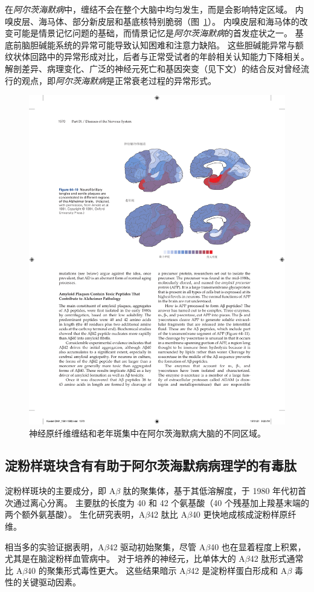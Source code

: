 在\textit{阿尔茨海默病}中，缠结不会在整个大脑中均匀发生，而是会影响特定区域。
内嗅皮层、海马体、部分新皮层和基底核特别脆弱（图~\ref{fig:64_10}）。
内嗅皮层和海马体的改变可能是情景记忆问题的基础，而情景记忆是\textit{阿尔茨海默病}的首发症状之一。
基底前脑胆碱能系统的异常可能导致认知困难和注意力缺陷。
这些胆碱能异常与额纹状体回路中的异常形成对比，后者与正常受试者的年龄相关认知能力下降相关。
解剖差异、病理变化、广泛的神经元死亡和基因突变（见下文）的结合反对曾经流行的观点，即\textit{阿尔茨海默病}是正常衰老过程的异常形式。


\begin{figure}[htbp]
	\centering
	\includegraphics[width=0.7\linewidth]{chap64/fig_64_10}
	\caption{神经原纤维缠结和老年斑集中在阿尔茨海默病大脑的不同区域\cite{arnold1991topographical}。}
	\label{fig:64_10}
\end{figure}



\subsection{淀粉样斑块含有有助于阿尔茨海默病病理学的有毒肽}

淀粉样斑块的主要成分，即 A$\beta$ 肽的聚集体，基于其低溶解度，于 1980 年代初首次通过离心分离。
主要肽的长度为 40 和 42 个氨基酸（40 个残基加上羧基末端的两个额外氨基酸）。
生化研究表明，A$\beta$42 肽比 A$\beta$40 更快地成核成淀粉样原纤维。


相当多的实验证据表明，A$\beta$42 驱动初始聚集，尽管 A$\beta$40 也在显着程度上积累，尤其是在脑淀粉样血管病中。
对于培养的神经元，比单体大的 A$\beta$42 肽形式通常比 A$\beta$40 的聚集形式毒性更大。
这些结果暗示 A$\beta$42 是淀粉样蛋白形成和 A$\beta$ 毒性的关键驱动因素。


